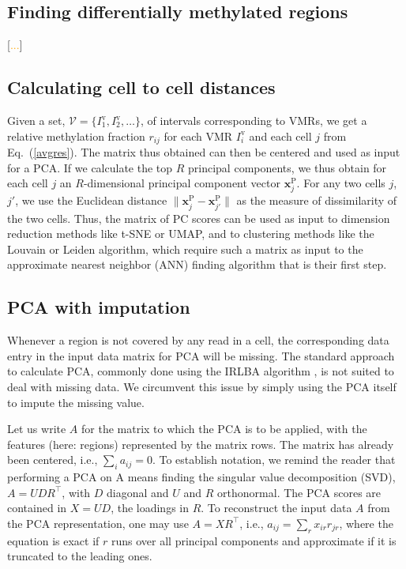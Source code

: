 \documentclass[twocolumn,10pt]{article}
\newcommand{\todo}[1]{[\textcolor{orange}{#1}]}
\begin{document}
\subsection{Finding differentially methylated regions}

\todo{...}

\subsection{Calculating cell to cell distances}

Given a set, $\mathcal{V}=\{I^\text{v}_1,I^\text{v}_2,\dots\}$, of intervals corresponding to VMRs, we get a relative methylation fraction $r_{ij}$ for each VMR $I^\text{v}_i$ and each cell $j$ from Eq.\ (\ref{avgres}).
The matrix thus obtained can then be centered and used as input for a PCA.
If we calculate the top $R$ principal components, we thus obtain for each cell $j$ an $R$-dimensional principal component vector $\mathbf{x}^\text{P}_j$.
For any two cells $j$, $j'$, we use the Euclidean distance $\|\mathbf{x}^\text{P}_j - \mathbf{x}^\text{P}_{j'}\|$ as the measure of dissimilarity of the two cells.
Thus, the matrix of PC scores can be used as input to dimension reduction methods like t-SNE or UMAP, and to clustering methods like the Louvain or Leiden algorithm, which require such a matrix as input to the approximate nearest neighbor (ANN) finding algorithm that is their first step.

\subsection{PCA with imputation}

Whenever a region is not covered by any read in a cell, the corresponding data entry in the input data matrix for PCA will be missing.
The standard approach to calculate PCA, commonly done using the IRLBA algorithm \citep{Baglama2005}, is not suited to deal with missing data.
We circumvent this issue by simply using the PCA itself to impute the missing value.

Let us write $A$ for the matrix to which the PCA is to be applied, with the features (here: regions) represented by the matrix rows.
The matrix has already been centered, i.e., $\sum_i a_{ij}=0$.
To establish notation, we remind the reader that performing a PCA on A means finding the singular value decomposition (SVD), $A=UDR^\top$, with $D$ diagonal and $U$ and $R$ orthonormal.
The PCA scores are contained in $X=UD$, the loadings in $R$.
To reconstruct the input data $A$ from the PCA representation, one may use $A=XR^\top$, i.e., $a_{ij}=\sum_r x_{ir} r_{jr}$, where the equation is exact if $r$ runs over all principal components and approximate if it is truncated to the leading ones.
\end{document}

